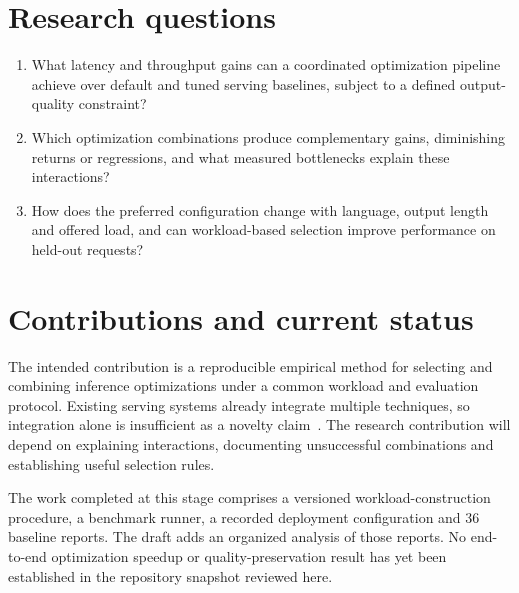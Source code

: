 \section{Research questions}
\begin{enumerate}[label=\textbf{RQ\arabic*.}]
\item What latency and throughput gains can a coordinated optimization pipeline achieve over default and tuned serving baselines, subject to a defined output-quality constraint?
\item Which optimization combinations produce complementary gains, diminishing returns or regressions, and what measured bottlenecks explain these interactions?
\item How does the preferred configuration change with language, output length and offered load, and can workload-based selection improve performance on held-out requests?
\end{enumerate}

\section{Contributions and current status}
The intended contribution is a reproducible empirical method for selecting and combining inference optimizations under a common workload and evaluation protocol. Existing serving systems already integrate multiple techniques, so integration alone is insufficient as a novelty claim~\cite{vllm,sglang,flashinfer}. The research contribution will depend on explaining interactions, documenting unsuccessful combinations and establishing useful selection rules.

The work completed at this stage comprises a versioned workload-construction procedure, a benchmark runner, a recorded deployment configuration and 36 baseline reports. The draft adds an organized analysis of those reports. No end-to-end optimization speedup or quality-preservation result has yet been established in the repository snapshot reviewed here.

